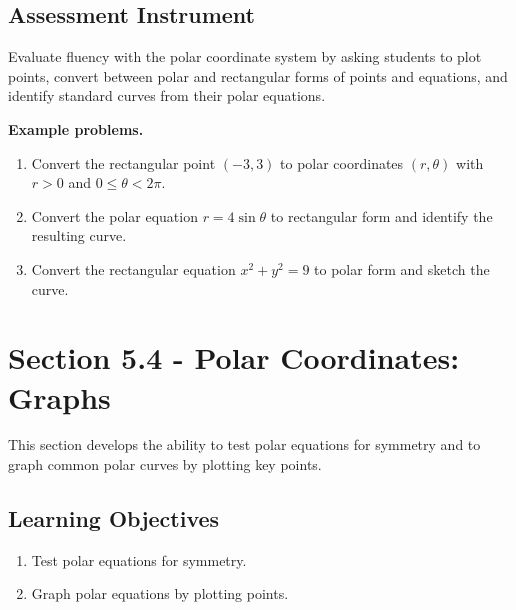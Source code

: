 \subsection{Assessment Instrument}
\label{ssec:asse-3669}

Evaluate fluency with the polar coordinate system by asking students to plot points,
convert between polar and rectangular forms of points and equations, and identify standard
curves from their polar equations.

\textbf{Example problems.}
\begin{enumerate}
    \item Convert the rectangular point $(-3, 3)$ to polar coordinates $(r, \theta)$ with $r > 0$ and $0 \leq \theta < 2\pi$.
    \item Convert the polar equation $r = 4\sin\theta$ to rectangular form and identify the resulting curve.
    \item Convert the rectangular equation $x^{2} + y^{2} = 9$ to polar form and sketch the curve.
\end{enumerate}

\section{Section 5.4 - Polar Coordinates: Graphs}
\label{sec:sect-5223}

This section develops the ability to test polar equations for symmetry and to graph common
polar curves by plotting key points.

\subsection{Learning Objectives}
\label{ssec:lear-fe6e}

\begin{enumerate}
    \item Test polar equations for symmetry.
    \item Graph polar equations by plotting points.
\end{enumerate}

